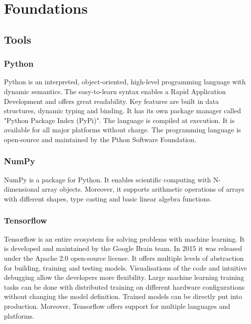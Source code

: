 \chapter{Foundations}

\section{Tools}

\subsection*{Python}

Python is an interpreted, object-oriented, high-level programming language with dynamic semantics.
The easy-to-learn syntax enables a Rapid Application Development and offers great readability.
Key features are built in data structures, dynamic typing and binding.
\cite{python-lang}
It has its own package manager called "Python Package Index (PyPi)".
The language is compiled at execution.
It is available for all major platforms without charge.
The programming language is open-source and maintained by the Pthon Software Foundation.
\cite{python-software-foundation}


\subsection*{NumPy}

NumPy is a package for Python.
It enables scientific computing with N-dimensional array objects.
Moreover, it supports arithmetic operations of arrays with different shapes, type casting and basic linear algebra functions.
\cite{numpy-package, numpy-broadcasting}


\subsection*{Tensorflow}

Tensorflow is an entire ecosystem for solving problems with machine learning.
It is developed and maintained by the Google Brain team.
In 2015 it was released under the Apache 2.0 open-source license.
It offers multiple levels of abstraction for building, training and testing models.
Visualisations of the code and intuitive debugging allow the developers more flexibility.
Large machine learning training tasks can be done with distributed training on different hardware configurations without changing the model definition.
Trained models can be directly put into production.
Moreover, Tensorflow offers support for multiple languages and platforms.
\cite{tensorflow-about}

